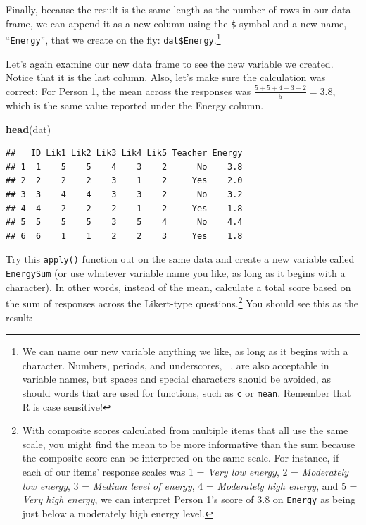 \documentclass[]{tufte-handout}
\newenvironment{Shaded}{}{}
\newcommand{\DecValTok}[1]{\textcolor[rgb]{0.25,0.63,0.44}{#1}}
\newcommand{\KeywordTok}[1]{\textcolor[rgb]{0.00,0.44,0.13}{\textbf{#1}}}
\newcommand{\NormalTok}[1]{#1}
\newcommand{\OperatorTok}[1]{\textcolor[rgb]{0.40,0.40,0.40}{#1}}
\newcommand{\StringTok}[1]{\textcolor[rgb]{0.25,0.44,0.63}{#1}}
\begin{document}
\begin{Shaded}
\end{Shaded}

Finally, because the result is the same length as the number of rows in
our data frame, we can append it as a new column using the \texttt{\$}
symbol and a new name, ``\texttt{Energy}'', that we create on the fly:
\texttt{dat\$Energy}.\footnote{We can name our new variable anything we
  like, as long as it begins with a character. Numbers, periods, and
  underscores, \texttt{\_}, are also acceptable in variable names, but
  spaces and special characters should be avoided, as should words that
  are used for functions, such as \texttt{c} or \texttt{mean}. Remember
  that R is case sensitive!}

Let's again examine our new data frame to see the new variable we
created. Notice that it is the last column. Also, let's make sure the
calculation was correct: For Person 1, the mean across the responses was
\(\frac{5+5+4+3+2}{5}=3.8\), which is the same value reported under the
Energy column.

\begin{Shaded}
\begin{Highlighting}[]
\KeywordTok{head}\NormalTok{(dat)}
\end{Highlighting}
\end{Shaded}

\begin{verbatim}
##   ID Lik1 Lik2 Lik3 Lik4 Lik5 Teacher Energy
## 1  1    5    5    4    3    2      No    3.8
## 2  2    2    2    3    1    2     Yes    2.0
## 3  3    4    4    3    3    2      No    3.2
## 4  4    2    2    2    1    2     Yes    1.8
## 5  5    5    5    3    5    4      No    4.4
## 6  6    1    1    2    2    3     Yes    1.8
\end{verbatim}

Try this \texttt{apply()} function out on the same data and create a new
variable called \texttt{EnergySum} (or use whatever variable name you
like, as long as it begins with a character). In other words, instead of
the mean, calculate a total score based on the sum of responses across
the Likert-type questions.\footnote{With composite scores calculated
  from multiple items that all use the same scale, you might find the
  mean to be more informative than the sum because the composite score
  can be interpreted on the same scale. For instance, if each of our
  items' response scales was 1 = \emph{Very low energy}, 2 =
  \emph{Moderately low energy}, 3 = \emph{Medium level of energy}, 4 =
  \emph{Moderately high energy}, and 5 = \emph{Very high energy}, we can
  interpret Person 1's score of 3.8 on \texttt{Energy} as being just
  below a moderately high energy level.} You should see this as the
result:
\end{document}
